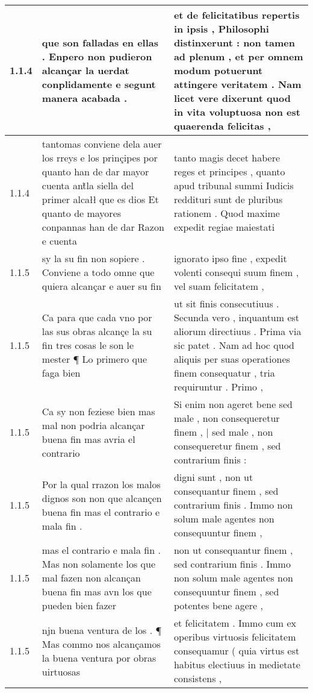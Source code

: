 \begin{tabular}{|p{1cm}|p{6.5cm}|p{6.5cm}|}

\hline
1.1.4 & que son falladas en ellas . Enpero non pudieron alcançar la uerdat conplidamente e segunt manera acabada . & et de felicitatibus repertis in ipsis , Philosophi distinxerunt : non tamen ad plenum , et per omnem modum potuerunt attingere veritatem . Nam licet vere dixerunt quod in vita voluptuosa non est quaerenda felicitas , \\\hline
1.1.4 & tantomas conviene dela auer los rreys e los prinçipes por quanto han de dar mayor cuenta ant̃la siella del primer alcałł que es dios Et quanto de mayores conpannas han de dar Razon e cuenta & tanto magis decet habere reges et principes , quanto apud tribunal summi Iudicis reddituri sunt de pluribus rationem . Quod maxime expedit regiae maiestati \\\hline
1.1.5 & sy la su fin non sopiere . Conviene a todo omne que quiera alcançar e auer su fin & ignorato ipso fine , expedit volenti consequi suum finem , vel suam felicitatem , \\\hline
1.1.5 & Ca para que cada vno por las sus obras alcançe la su fin tres cosas le son le mester ¶ Lo primero que faga bien & ut sit finis consecutiuus . Secunda vero , inquantum est aliorum directiuus . Prima via sic patet . Nam ad hoc quod aliquis per suas operationes finem consequatur , tria requiruntur . Primo , \\\hline
1.1.5 & Ca sy non feziese bien mas mal non podria alcançar buena fin mas avria el contrario & Si enim non ageret bene sed male , non consequeretur finem , | sed male , non consequeretur finem , sed contrarium finis : \\\hline
1.1.5 & Por la qual rrazon los malos dignos son non que alcançen buena fin mas el contrario e mala fin . & digni sunt , non ut consequantur finem , sed contrarium finis . Immo non solum male agentes non consequuntur finem , \\\hline
1.1.5 & mas el contrario e mala fin . Mas non solamente los que mal fazen non alcançan buena fin mas avn los que pueden bien fazer & non ut consequantur finem , sed contrarium finis . Immo non solum male agentes non consequuntur finem , sed potentes bene agere , \\\hline
1.1.5 & njn buena ventura de los . ¶ Mas commo nos alcançamos la buena ventura por obras uirtuosas & et felicitatem . Immo cum ex operibus virtuosis felicitatem consequamur ( quia virtus est habitus electiuus in medietate consistens , \\\hline

\end{tabular}
